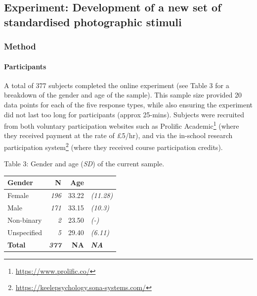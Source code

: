 \documentclass[
  11pt,
]{article}
\begin{document}
\hypertarget{experiment-development-of-a-new-set-of-standardised-photographic-stimuli}{%
\subsection{Experiment: Development of a new set of standardised
photographic
stimuli}\label{experiment-development-of-a-new-set-of-standardised-photographic-stimuli}}

\newpage

\hypertarget{method-1}{%
\subsubsection{Method}\label{method-1}}

\hypertarget{participants-1}{%
\paragraph{Participants}\label{participants-1}}

A total of 377 subjects completed the online experiment (see Table 3 for
a breakdown of the gender and age of the sample). This sample size
provided 20 data points for each of the five response types, while also
ensuring the experiment did not last too long for participants (approx
25-mins). Subjects were recruited from both voluntary participation
websites such as
Prolific Academic\footnote{\url{https://www.prolific.co/}} (where they
received payment at the rate of £5/hr), and via the in-school
research participation system\footnote{\url{https://keelepsychology.sona-systems.com/}}
(where they received course participation credits).

Table 3: Gender and age (\emph{SD}) of the current sample.

\begin{table}[!h]
\centering
\begin{tabular}{l>{}rr>{}l}
\toprule
Gender & N & Age & \\
\midrule
Female & \em{196} & 33.22 & \em{(11.28)}\\
Male & \em{171} & 33.15 & \em{(10.3)}\\
Non-binary & \em{2} & 23.50 & \em{(-)}\\
Unspecified & \em{5} & 29.40 & \em{(6.11)}\\
\textbf{Total} & \textbf{\em{377}} & \textbf{NA} & \textbf{\em{NA}}\\
\bottomrule
\end{tabular}
\end{table}
\end{document}
